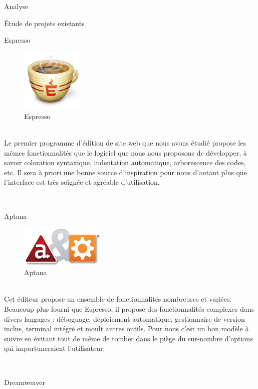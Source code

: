 \documentclass[a4paper, 12pt]{report}
\begin{document}
\begin{part}{Analyse}
		\begin{chapter}{Étude de projets existants}
		\begin{section}{Espresso}
				\begin{figure}[h]
					\begin{center}
						\includegraphics[width=3cm]{images/logoEspresso.png}
						\caption{Espresso}
					\end{center}
				\end{figure}~\\
				Le premier programme d'édition de site web que nous avons étudié propose les mêmes fonctionnalités que le
				logiciel que nous nous proposons de développer, à savoir coloration syntaxique, indentation automatique, arborescence des codes, etc.
				Il sera à priori une bonne source d'inspiration pour nous d'autant plus que l'interface est très soignée et agréable d'utilisation.
			\end{section}
			~\\
			\begin{section}{Aptana}
				\begin{figure}[h]
					\begin{center}
						\includegraphics[width=4cm]{images/logoAptana.png}
						\caption{Aptana}
					\end{center}
				\end{figure}~\\
				Cet éditeur propose un ensemble de fonctionnalités nombreuses et variées. 
				Beaucoup plus fourni que Espresso, il propose des fonctionnalités complexes dans divers langages : 
				déboguage, déploiement automatique, gestionnaire de version inclus, terminal intégré et moult autres outils.
				Pour nous c'est un bon modèle à suivre en évitant tout de même de tomber dans le piège du sur-nombre d'options 
				qui importuneraient l'utilisateur. 
			\end{section}
			~\\
			\begin{section}{Dreamweaver}

\end{section}
\end{chapter}
\end{part}
\end{document}
